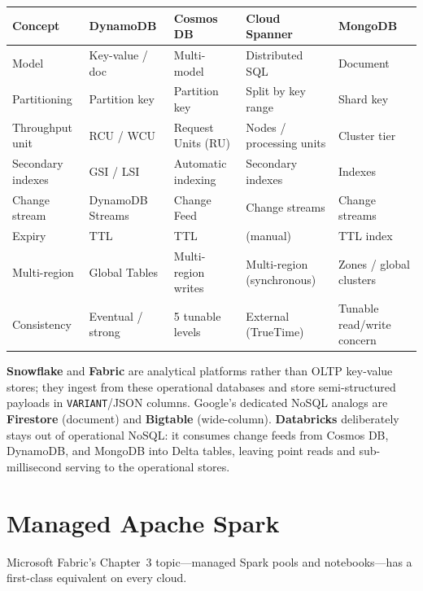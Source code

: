 \begin{center}
\footnotesize
\begin{tabular}{@{}p{2.8cm}p{2.9cm}p{2.9cm}p{2.9cm}p{2.4cm}@{}}
\toprule
\textbf{Concept} & \textbf{DynamoDB} & \textbf{Cosmos DB} & \textbf{Cloud Spanner} & \textbf{MongoDB} \\
\midrule
Model & Key-value / doc & Multi-model & Distributed SQL & Document \\
Partitioning & Partition key & Partition key & Split by key range & Shard key \\
Throughput unit & RCU / WCU & Request Units (RU) & Nodes / processing units & Cluster tier \\
Secondary indexes & GSI / LSI & Automatic indexing & Secondary indexes & Indexes \\
Change stream & DynamoDB Streams & Change Feed & Change streams & Change streams \\
Expiry & TTL & TTL & (manual) & TTL index \\
Multi-region & Global Tables & Multi-region writes & Multi-region (synchronous) & Zones / global clusters \\
Consistency & Eventual / strong & 5 tunable levels & External (TrueTime) & Tunable read/write concern \\
\bottomrule
\end{tabular}
\end{center}

\noindent \textbf{Snowflake} and \textbf{Fabric} are analytical platforms rather than OLTP key-value
stores; they ingest from these operational databases and store semi-structured payloads in
\texttt{VARIANT}/JSON columns. Google's dedicated NoSQL analogs are \textbf{Firestore} (document)
and \textbf{Bigtable} (wide-column). \textbf{Databricks} deliberately stays out of operational
NoSQL: it consumes change feeds from Cosmos DB, DynamoDB, and MongoDB into Delta tables, leaving
point reads and sub-millisecond serving to the operational stores.

\section{Managed Apache Spark}
%
Microsoft Fabric's Chapter~3 topic---managed Spark pools and notebooks---has a first-class
equivalent on every cloud.

